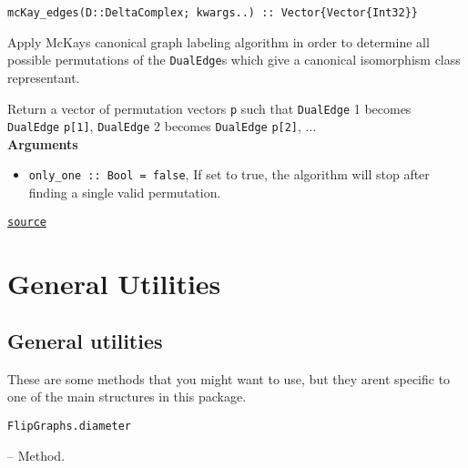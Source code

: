 \begin{adjustwidth}{2em}{0pt}


\begin{verbatim}
mcKay_edges(D::DeltaComplex; kwargs..) :: Vector{Vector{Int32}}
\end{verbatim}

Apply McKay{\textquotesingle}s canonical graph labeling algorithm in order to determine all possible permutations  of the \texttt{DualEdge}s which give a canonical isomorphism class representant.

Return a vector of permutation vectors \texttt{p} such that \texttt{DualEdge} 1 becomes \texttt{DualEdge} \texttt{p[1]}, \texttt{DualEdge} 2 becomes \texttt{DualEdge} \texttt{p[2]}, ...\\


\textbf{Arguments}

\begin{itemize}
\item \texttt{only\_one :: Bool = false}, If set to true, the algorithm will stop after finding a single valid permutation.

\end{itemize}


\href{https://github.com/schto223/FlipGraphs.jl/blob/e35d43698a06b86273148826b79d585ba04fcd26/src/flipGraph.jl#L853-L863}{\texttt{source}}


\end{adjustwidth}



\part{General Utilities}


\chapter{General utilities}



\label{15108808020745066681}{}


These are some methods that you might want to use, but they aren{\textquotesingle}t specific to one of the main structures in this package.


\hypertarget{14583114515296484060}{\texttt{FlipGraphs.diameter}}  -- {Method.}

